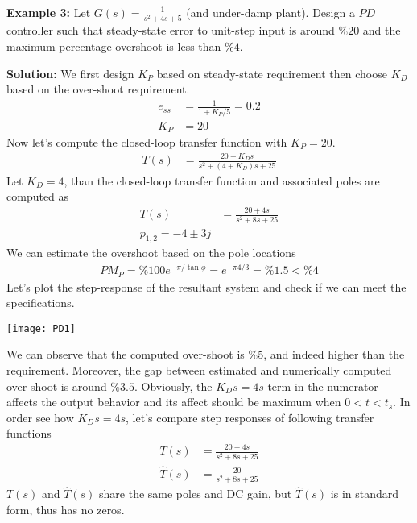 \documentclass[twoside]{article}
\begin{document}
\textbf{Example 3:} Let $G(s) = \frac{1}{s^2 + 4 s + 5}$ (and under-damp
plant). Design a $PD$ controller such that steady-state error to
unit-step input is around $\% 20$ and the maximum percentage overshoot
is less than $\% 4$. 

\textbf{Solution:} We first design $K_P$ based on steady-state
requirement then choose $K_D$ based on the over-shoot requirement.
%
  \begin{align*}
    e_{ss} &= \frac{1}{1 + K_P/5} = 0.2
    \\
   K_P &= 20
  \end{align*} 
%
Now let's compute the closed-loop transfer function with $K_P = 20$.
  \begin{align*}
   T(s) &= \frac{20 + K_D s}{s^2 + (4 + K_D) s + 25}
  \end{align*} 
%
Let $K_D = 4$, than the closed-loop transfer function and associated
poles are computed as
%
  \begin{align*}
   T(s) &= \frac{20 + 4s}{s^2 + 8 s + 25}
  \\
  p_{1,2} = -4 \pm 3 j
  \end{align*} 
% 
We can estimate the overshoot based on the pole locations
%
  \begin{align*}
    PM_P = \% 100 e^{-\pi / \tan \phi} = e^{-\pi 4 / 3} = \% 1.5 < \% 4
  \end{align*} 
%
Let's plot the step-response of the resultant system and check if we
can meet the specifications.

\vspace{12 pt}

  \begin{minipage}[h]{1\linewidth}
    \begin{center}
      \texttt{[image: PD1]}
    \end{center}
  \end{minipage}

\vspace{12 pt}

We can observe that the computed over-shoot is $\% 5$, and indeed
higher than the requirement. Moreover, the gap between estimated
and numerically computed over-shoot is around $\%3.5$. Obviously,
the $K_D s = 4 s$ term in the numerator affects the output behavior and
its affect should be maximum when $0 < t < t_s$. In order see how
$K_D s = 4 s$, let's compare step responses of following transfer
functions
%
\begin{align*}
   T(s) &= \frac{20 + 4s}{s^2 + 8 s + 25}
  \\
   \hat{T}(s) &= \frac{20}{s^2 + 8 s + 25}
  \end{align*} 
% 
$T(s)$ and $\hat{T}(s)$ share the same poles and DC gain, but
$\hat{T}(s)$ is in standard form, thus has no zeros.
\end{document}
